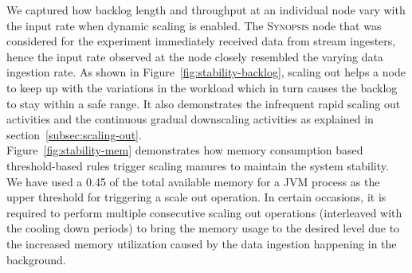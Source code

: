 We captured how backlog length and throughput at an individual node vary with the input rate when dynamic scaling is enabled.
The \textsc{Synopsis} node that was considered for the experiment immediately received data from stream ingesters, hence the input rate observed at the node closely resembled the varying data ingestion rate.
As shown in Figure~\ref{fig:stability-backlog}, scaling out helps a node to keep up with the variations in the workload which in turn causes the backlog to stay within a safe range.
It also demonstrates the infrequent rapid scaling out activities and the continuous gradual downscaling activities as explained in section~\ref{subsec:scaling-out}. \\

Figure~\ref{fig:stability-mem} demonstrates how memory consumption based threshold-based rules trigger scaling manures to maintain the system stability.
We have used a 0.45 of the total available memory for a JVM process as the upper threshold for triggering a scale out operation.
In certain occasions, it is required to perform multiple consecutive scaling out operations (interleaved with the cooling down periods) to bring the memory usage to the desired level due to the increased memory utilization caused by the data ingestion happening in the background.
